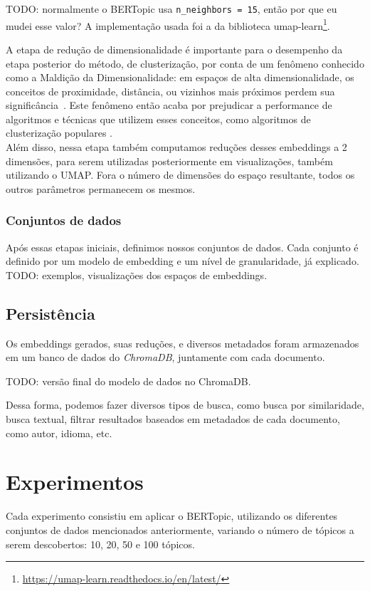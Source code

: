 TODO: normalmente o BERTopic usa \verb|n_neighbors = 15|, então por que eu mudei esse valor?
A implementação usada foi a da biblioteca umap-learn\footnote{\url{https://umap-learn.readthedocs.io/en/latest/}}.

A etapa de redução de dimensionalidade é importante para o desempenho da etapa posterior do método, de clusterização, por conta de um fenômeno conhecido como a Maldição da Dimensionalidade: em espaços de alta dimensionalidade, os conceitos de proximidade, distância, ou vizinhos mais próximos perdem sua significância~\citep{dimen_hubs}. Este fenômeno então acaba por prejudicar a performance de algoritmos e técnicas que utilizem esses conceitos, como algoritmos de clusterização populares \citep{dimen_hubs, dimen_distance_metrics}.\\
Além disso, nessa etapa também computamos reduções desses embeddings a 2 dimensões, para serem utilizadas posteriormente em visualizações, também utilizando o UMAP. Fora o número de dimensões do espaço resultante, todos os outros parâmetros permanecem os mesmos.

\subsubsection{Conjuntos de dados}
Após essas etapas iniciais, definimos nossos conjuntos de dados. Cada conjunto é definido por um modelo de embedding e um nível de granularidade, já explicado. TODO: exemplos, visualizações dos espaços de embeddings.

\subsection{Persistência}
Os embeddings gerados, suas reduções, e diversos metadados foram armazenados em um banco de dados do \textit{ChromaDB}, juntamente com cada documento.

TODO: versão final do modelo de dados no ChromaDB.

Dessa forma, podemos fazer diversos tipos de busca, como busca por similaridade, busca textual, filtrar resultados baseados em metadados de cada documento, como autor, idioma, etc.

\section{Experimentos}
Cada experimento consistiu em aplicar o BERTopic, utilizando os diferentes conjuntos de dados mencionados anteriormente, variando o número de tópicos a serem descobertos: 10, 20, 50 e 100 tópicos.

